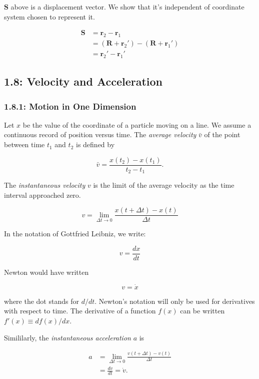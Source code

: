 \documentclass[12pt,twoside]{article}
\begin{document}
\begin{flushleft}
$\mathbf{S}$ above is a displacement vector. We show that it's independent of coordinate system chosen to represent it.

\begin{align*}
  \mathbf{S} &= \mathbf{r}_{2} - \mathbf{r}_{1} \\
             &= \left(\mathbf{R} + \mathbf{r}_{2}'\right) - \left(\mathbf{R} + \mathbf{r}_{1}'\right) \\
             &= \mathbf{r}_{2}' - \mathbf{r}_{1}'
\end{align*}

\subsection*{1.8: Velocity and Acceleration}
\subsubsection*{1.8.1: Motion in One Dimension}

Let $\mathit{x}$ be the value of the coordinate of a particle moving on a line. We assume a continuous record of position versus time.
The \textit{average velocity} $\mathit{\bar{v}}$ of the point between time $\textit{t}_{1}$ and $\textit{t}_{2}$ is defined by

$$
\mathit{\bar{v}} = \frac{\mathit{x}(\mathit{t}_{2}) - \mathit{x}(\mathit{t}_{1})}{\mathit{t}_{2} - \mathit{t}_{1}}.
$$

The \textit{instantaneous velocity} $\mathit{v}$ is the limit of the average velocity as the time interval approached zero.

$$
\mathit{v} = \lim_{\Delta\mathit{t} \rightarrow 0}\frac{\mathit{x}(\mathit{t} + \Delta\mathit{t}) - \mathit{x}(t)}{\Delta t}
$$

In the notation of Gottfried Leibniz, we write:

$$
v = \frac{dx}{dt}
$$

Newton would have written

$$
v = \dot{x}
$$

where the dot stands for $d/dt$. Newton's notation will only be used for derivatives with respect to time. The derivative of a function $f(x)$ can be
written $f'(x) \equiv df(x)/dx$.

Simililarly, the \textit{instantaneous acceleration} $a$ is

\begin{align*}
  a &= \lim_{\Delta\mathit{t} \rightarrow 0}\frac{\mathit{v}(\mathit{t} + \Delta\mathit{t}) - \mathit{v}(t)}{\Delta t} \\
    &= \frac{dv}{dt} = \dot{v}.
\end{align*}


\end{flushleft}
\end{document}
